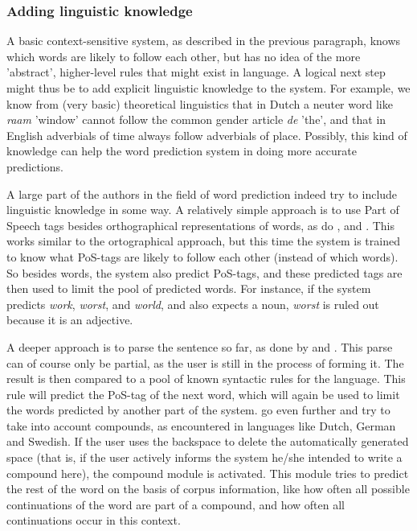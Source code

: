 \documentclass[12pt]{article}
\begin{document}
\subsubsection{Adding linguistic knowledge} \label{linguistic_knowledge}
A basic context-sensitive system, as described in the previous paragraph, knows which words are likely to follow each other, but has no idea of the more 'abstract', higher-level rules that might exist in language. A logical next step might thus be to add explicit linguistic knowledge to the system. For example, we know from (very basic) theoretical linguistics that in Dutch a neuter word like \emph{raam} 'window' cannot follow the common gender article \emph{de} 'the', and that in English adverbials of time always follow adverbials of place. Possibly, this kind of knowledge can help the word prediction system in doing more accurate predictions.

A large part of the authors in the field of word prediction indeed try to include linguistic knowledge in some way. A relatively simple approach is to use Part of Speech tags besides orthographical representations of words, as do ,  and . This works similar to the ortographical approach, but this time the system is trained to know what PoS-tags are likely to follow each other (instead of which words). So besides words, the system also predict PoS-tags, and these predicted tags are then used to limit the pool of predicted words. For instance, if the system predicts \emph{work}, \emph{worst}, and \emph{world}, and also expects a noun, \emph{worst} is ruled out because it is an adjective.

A deeper approach is to parse the sentence so far, as done by  and . This parse can of course only be partial, as the user is still in the process of forming it. The result is then compared to a pool of known syntactic rules for the language. This rule will predict the PoS-tag of the next word, which will again be used to limit the words predicted by another part of the system.  go even further and try to take into account compounds, as encountered in languages like Dutch, German and Swedish. If the user uses the backspace to delete the automatically generated space (that is, if the user actively informs the system he/she intended to write a compound here), the compound module is activated. This module tries to predict the rest of the word on the basis of corpus information, like how often all possible continuations of the word are part of a compound, and how often all continuations occur in this context.
\end{document}
